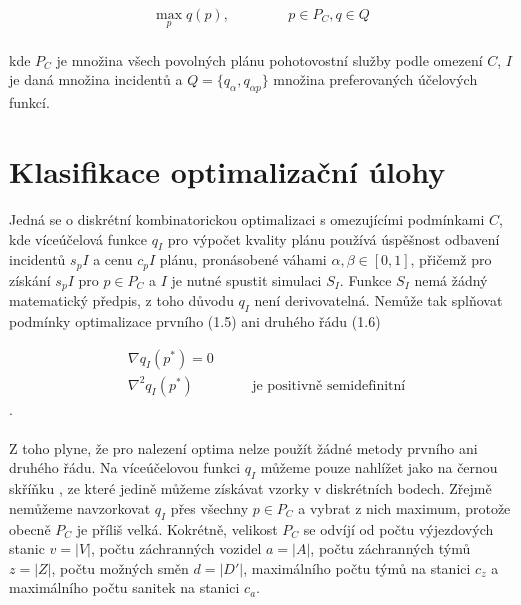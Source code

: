 \begin{definice}
  \begin{align}
    \max_{p} q(p), \hspace{50pt} p \in P_C, q \in Q 
  \end{align}
  \\
  kde $P_C$ je množina všech povolných plánu pohotovostní služby podle omezení $C$, $I$ je daná množina incidentů a $Q = \{ q_{\alpha}, q_{\alpha p}\}$ množina preferovaných účelových funkcí.
\end{definice}

\section{Klasifikace optimalizační úlohy}



Jedná se o diskrétní kombinatorickou optimalizaci s omezujícími podmínkami $C$, kde víceúčelová funkce $q_I$ pro výpočet kvality plánu používá úspěšnost
odbavení incidentů $s_pI$ a cenu $c_pI$ plánu, pronásobené váhami $\alpha, \beta \in [0, 1]$,
přičemž pro získání $s_pI$ pro $p \in P_C$ a $I$ je nutné spustit simulaci $S_I$.
Funkce $S_I$ nemá žádný matematický předpis, z toho důvodu $q_I$ není derivovatelná.
Nemůže tak splňovat podmínky optimalizace prvního (1.5) ani druhého řádu (1.6) %

\begin{align}
  &\nabla q_I(p^*) = 0 \\
  &\nabla^2 q_I(p^*) \hspace{50pt} \text{je positivně semidefinitní}
\end{align}
.
\\
\\
Z toho plyne, že pro nalezení optima nelze použít žádné metody prvního ani druhého řádu. %
Na víceúčelovou funkci $q_I$ můžeme pouze nahlížet jako na černou skříňku %
, ze které jedině můžeme získávat vzorky v diskrétních bodech.
Zřejmě nemůžeme navzorkovat $q_I$ přes všechny $p \in P_C$ a vybrat z nich maximum, protože obecně $P_C$ je příliš velká.
Kokrétně, velikost $P_C$ se odvíjí od počtu výjezdových stanic $v = |V|$, počtu záchranných vozidel $a = |A|$, počtu záchranných týmů $z = |Z|$, počtu možných směn $d = |D'|$, 
maximálního počtu týmů na stanici $c_z$ a maximálního počtu sanitek na stanici $c_a$.


